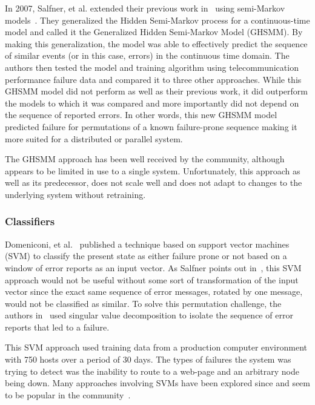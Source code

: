 In 2007, Salfner, et al. extended their previous work in~\cite{salfner2006}
using semi-Markov models~\cite{salfner2007}.  They generalized the Hidden
Semi-Markov process for a continuous-time model and called it the Generalized
Hidden Semi-Markov Model (GHSMM).  By making this generalization, the model
was able to effectively predict the sequence of similar events (or in this
case, errors) in the continuous time domain.  The authors then tested the model
and training algorithm using telecommunication performance failure data and
compared it to three other approaches.  While this GHSMM model did not perform
as well as their previous work, it did outperform the models to which it was
compared and more importantly did not depend on the sequence of reported
errors.  In other words, this new GHSMM model predicted failure for
permutations of a known failure-prone sequence making it more suited for a
distributed or parallel system.

The GHSMM approach has been well received by the community, although appears to
be limited in use to a single system.  Unfortunately, this approach as well as
its predecessor, does not scale well and does not adapt to changes to the
underlying system without retraining.

\subsubsection{Classifiers}
Domeniconi, et al.~\cite{domeniconi2002} published a technique based on
support vector machines (SVM) to classify the present state as either failure
prone or not based on a window of error reports as an input vector.  As Salfner
points out in~\cite{salfnerSurvey}, this SVM approach would not be useful
without some sort of transformation of the input vector since the exact same
sequence of error messages, rotated by one message, would not be classified as
similar.  To solve this permutation challenge, the authors
in~\cite{domeniconi2002} used singular value decomposition to isolate the
sequence of error reports that led to a failure.

This SVM approach used training data from a production computer environment
with 750 hosts over a period of 30 days.  The types of failures the system was
trying to detect was the inability to route to a web-page and an arbitrary node
being down.  Many approaches involving SVMs have been explored since and seem
to be popular in the community~\cite{fronza2013, fulp2008, murray2005,
domeniconi2002, irrera2015}.

